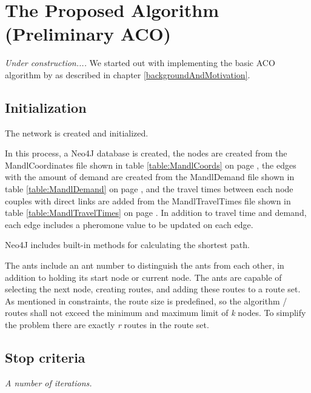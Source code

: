 \section{The Proposed Algorithm (Preliminary ACO) }

\textit{Under construction....}
\newline
We started out with implementing the basic ACO algorithm by \citet{nanda11} as described in chapter \ref{backgroundAndMotivation}.

\subsection{Initialization}

The network is created and initialized.

In this process, a Neo4J database is created, the nodes are created from the MandlCoordinates file shown in table \ref{table:MandlCoords} on page \pageref{table:MandlCoords}, the edges with the amount of demand are created from the MandlDemand file shown in table \ref{table:MandlDemand} on page \pageref{table:MandlDemand}, and the travel times between each node couples with direct links are added from the MandlTravelTimes file shown in table \ref{table:MandlTravelTimes} on page \pageref{table:MandlTravelTimes}. In addition to travel time and demand, each edge includes a pheromone value to be updated on each edge.

Neo4J includes built-in methods for calculating the shortest path. 

The ants include an ant number to distinguish the ants from each other, in addition to holding its start node or current node. The ants are capable of selecting the next node, creating routes, and adding these routes to a route set. As mentioned in constraints, the route size is predefined, so the algorithm / routes shall not exceed the minimum and maximum limit of \textit{k} nodes. To simplify the problem there are exactly \textit{r} routes in the route set.

\subsection{Stop criteria}

\textit{A number of iterations.}

